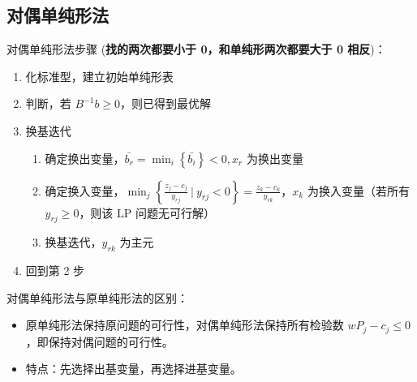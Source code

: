 \subsection{对偶单纯形法}
\begin{note}
    对偶单纯形法步骤 (\textbf{找的两次都要小于 0，和单纯形两次都要大于 0 相反})：
    \begin{enumerate}
        \item 化标准型，建立初始单纯形表
        \item 判断，若 $B^{-1}b \ge 0$，则已得到最优解
        \item 换基迭代 \begin{enumerate}
            \item 确定换出变量，$\bar{b_r} = \min_i\left\{\bar{b_i}\right\} < 0, x_r$ 为换出变量
            \item 确定换入变量，$\min_{j}\left\{\frac{z_j - c_j}{y_{rj}}\ |\ y_{rj} < 0\right\} = \frac{z_k - c_k}{y_{rk}}$，$x_k$ 为换入变量（若所有 $y_{rj} \ge 0$，则该 LP 问题无可行解）
            \item 换基迭代，$y_{rk}$ 为主元
        \end{enumerate}
        \item 回到第 2 步
    \end{enumerate}
\end{note}

\begin{note}
    对偶单纯形法与原单纯形法的区别：
    \begin{itemize}
        \item 原单纯形法保持原问题的可行性，对偶单纯形法保持所有检验数 $wP_j - c_j \le 0$，即保持对偶问题的可行性。
        \item 特点：先选择出基变量，再选择进基变量。
    \end{itemize}
\end{note}


